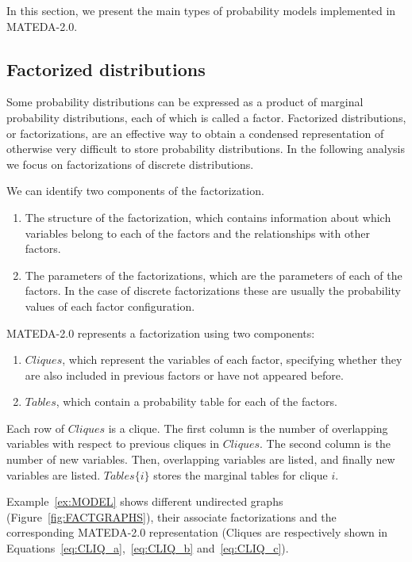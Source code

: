 \documentclass[a4paper]{article}
\begin{document}
In this section, we present the main types of probability models
implemented in MATEDA-2.0.


\subsection{Factorized distributions}

Some probability distributions can be expressed as a product of
marginal probability distributions, each of which is called a factor.
Factorized distributions, or factorizations, are an effective way to
obtain a condensed representation of otherwise very difficult to
store probability distributions. In the following analysis we focus
on factorizations of discrete distributions.

We can identify two components of the factorization.

\begin{enumerate}
  \item The structure of the factorization, which contains
  information about which variables belong to each of the factors
  and the relationships with other factors.
  \item The parameters of the factorizations, which are the
  parameters of each of the factors. In the case of discrete
  factorizations these are usually the probability values of each
  factor configuration.
\end{enumerate}


MATEDA-2.0 represents a factorization using two components:

\begin{enumerate}
  \item $Cliques$, which represent the variables of each factor, specifying whether they
  are also included in previous factors or have not appeared before.
  \item $Tables$, which contain a probability table for each of the
  factors.
\end{enumerate}

Each row of $Cliques$ is a clique. The first column is the number of
overlapping variables with respect to  previous cliques in
$Cliques$. The second column is the number of new variables. Then,
overlapping variables are listed, and finally new variables are
listed. $Tables\{i\}$ stores the marginal tables for clique $i$.

Example~\ref{ex:MODEL} shows different undirected graphs
(Figure~\ref{fig:FACTGRAPHS}), their associate factorizations and
the corresponding MATEDA-2.0 representation (Cliques are
respectively shown in Equations~\ref{eq:CLIQ_a},~\ref{eq:CLIQ_b}
and~\ref{eq:CLIQ_c}).
\end{document}
